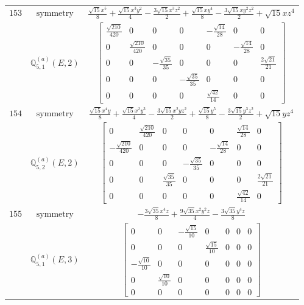 \documentclass[fleqn,8pt,landscape]{jsarticle}
\begin{document}
\begin{longtable}{ccc}
$ 153 $ & $ \text{symmetry} $ & $ \frac{\sqrt{15} x^{5}}{8} + \frac{\sqrt{15} x^{3} y^{2}}{4} - \frac{3 \sqrt{15} x^{3} z^{2}}{2} + \frac{\sqrt{15} x y^{4}}{8} - \frac{3 \sqrt{15} x y^{2} z^{2}}{2} + \sqrt{15} x z^{4} $ \\
$  $ & $ \mathbb{Q}_{5,1}^{(a)}(E,2) $ & $ \begin{bmatrix} \frac{\sqrt{210}}{420} & 0 & 0 & 0 & - \frac{\sqrt{14}}{28} & 0 & 0 \\ 0 & \frac{\sqrt{210}}{420} & 0 & 0 & 0 & - \frac{\sqrt{14}}{28} & 0 \\ 0 & 0 & - \frac{\sqrt{35}}{35} & 0 & 0 & 0 & \frac{2 \sqrt{21}}{21} \\ 0 & 0 & 0 & - \frac{\sqrt{35}}{35} & 0 & 0 & 0 \\ 0 & 0 & 0 & 0 & \frac{\sqrt{42}}{14} & 0 & 0 \end{bmatrix} $ \\ \hline
$ 154 $ & $ \text{symmetry} $ & $ \frac{\sqrt{15} x^{4} y}{8} + \frac{\sqrt{15} x^{2} y^{3}}{4} - \frac{3 \sqrt{15} x^{2} y z^{2}}{2} + \frac{\sqrt{15} y^{5}}{8} - \frac{3 \sqrt{15} y^{3} z^{2}}{2} + \sqrt{15} y z^{4} $ \\
$  $ & $ \mathbb{Q}_{5,2}^{(a)}(E,2) $ & $ \begin{bmatrix} 0 & \frac{\sqrt{210}}{420} & 0 & 0 & 0 & \frac{\sqrt{14}}{28} & 0 \\ - \frac{\sqrt{210}}{420} & 0 & 0 & 0 & - \frac{\sqrt{14}}{28} & 0 & 0 \\ 0 & 0 & 0 & - \frac{\sqrt{35}}{35} & 0 & 0 & 0 \\ 0 & 0 & \frac{\sqrt{35}}{35} & 0 & 0 & 0 & \frac{2 \sqrt{21}}{21} \\ 0 & 0 & 0 & 0 & 0 & \frac{\sqrt{42}}{14} & 0 \end{bmatrix} $ \\ \hline
$ 155 $ & $ \text{symmetry} $ & $ - \frac{3 \sqrt{35} x^{4} z}{8} + \frac{9 \sqrt{35} x^{2} y^{2} z}{4} - \frac{3 \sqrt{35} y^{4} z}{8} $ \\
$  $ & $ \mathbb{Q}_{5,1}^{(a)}(E,3) $ & $ \begin{bmatrix} 0 & 0 & - \frac{\sqrt{15}}{10} & 0 & 0 & 0 & 0 \\ 0 & 0 & 0 & \frac{\sqrt{15}}{10} & 0 & 0 & 0 \\ - \frac{\sqrt{10}}{10} & 0 & 0 & 0 & 0 & 0 & 0 \\ 0 & \frac{\sqrt{10}}{10} & 0 & 0 & 0 & 0 & 0 \\ 0 & 0 & 0 & 0 & 0 & 0 & 0 \end{bmatrix} $ \\ \hline

\end{longtable}
\end{document}
